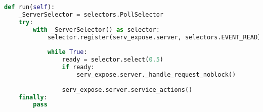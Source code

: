 \begin{lstlisting}[language=Python, 
                   caption = Examples code for XMLRPC server., 
                   label=cap:xmlrpc_server]
def run(self):    
    _ServerSelector = selectors.PollSelector                                   
    try:                                                                       
        with _ServerSelector() as selector:                                    
            selector.register(serv_expose.server, selectors.EVENT_READ)        
                                                                               
            while True:                                                        
                ready = selector.select(0.5)                                   
                if ready:                                                      
                    serv_expose.server._handle_request_noblock()               
                                                                               
                serv_expose.server.service_actions()                           
    finally:                                                                   
        pass 


\end{lstlisting}
